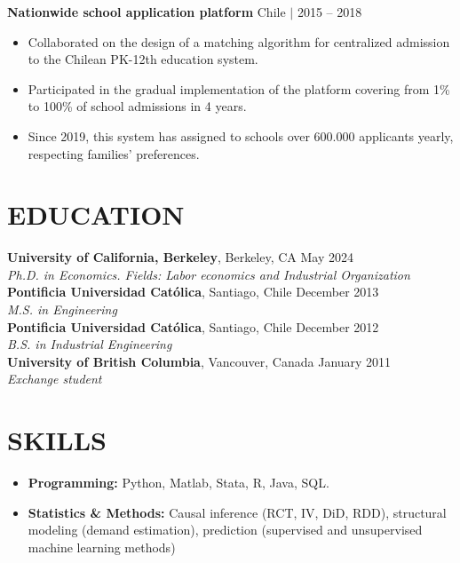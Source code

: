 \documentclass[letter,9pt]{extarticle}
\begin{document}
\noindent
\textbf{Nationwide school application platform} \hfill Chile $|$ 2015 – 2018
\begin{itemize}
    \item Collaborated on the design of a matching algorithm for centralized admission to the Chilean PK-12th education system.
    \item Participated in the gradual implementation of the platform covering from 1\% to 100\% of school admissions in 4 years.
    \item Since 2019, this system has assigned to schools over 600.000 applicants yearly, respecting families' preferences.
\end{itemize}


\section*{EDUCATION}
\textbf{University of California, Berkeley}, Berkeley, CA \hfill  May 2024\\ %
\textit{Ph.D. in Economics. Fields: Labor economics and Industrial Organization}\vspace{.1cm}\\ %
\textbf{Pontificia Universidad Católica}, Santiago, Chile \hfill  December 2013\\ %
\textit{M.S. in Engineering}\vspace{.1cm}\\   %
\textbf{Pontificia Universidad Católica}, Santiago, Chile \hfill  December 2012\\ %
\textit{B.S. in Industrial Engineering}\vspace{.1cm}\\   %
\textbf{University of British Columbia}, Vancouver, Canada \hfill  January 2011\\ %
\textit{Exchange student}   %

\section*{SKILLS}
\begin{itemize}
    \item \textbf{Programming:} Python, Matlab, Stata, R, Java, SQL.
    \item \textbf{Statistics \& Methods:} Causal inference (RCT, IV, DiD, RDD), structural modeling (demand estimation), prediction  (supervised and unsupervised machine learning methods)
\end{itemize}
\end{document}
